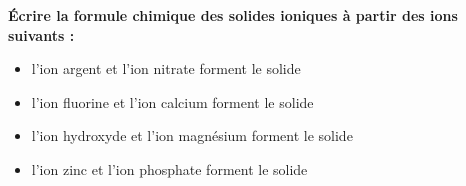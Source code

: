 \begin{mdframed}[style=autreexo]
\textbf{\'{E}crire la formule chimique des solides ioniques à partir des ions suivants :}
\begin{itemize}[label=\textbullet, font=\large]
    \item l'ion argent  et l'ion nitrate  forment le solide  
    \item l'ion fluorine  et l'ion calcium  forment le solide 
    \item l'ion hydroxyde  et l'ion magnésium  forment le solide 
    \item l'ion zinc  et l'ion phosphate  forment le solide 
\end{itemize}
\end{mdframed}
